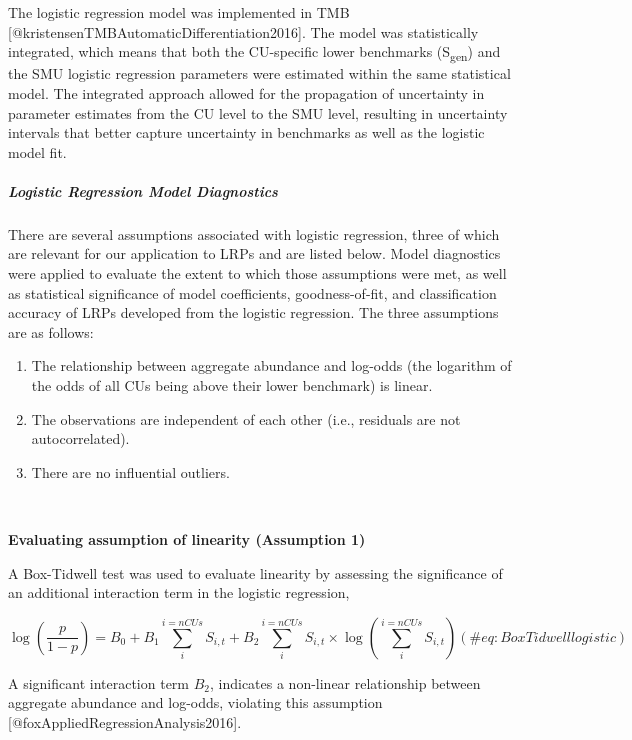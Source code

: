 \documentclass[
]{article}
\begin{document}
The logistic regression model was implemented in TMB
{[}@kristensenTMBAutomaticDifferentiation2016{]}. The model was
statistically integrated, which means that both the CU-specific lower
benchmarks (S\textsubscript{gen}) and the SMU logistic regression
parameters were estimated within the same statistical model. The
integrated approach allowed for the propagation of uncertainty in
parameter estimates from the CU level to the SMU level, resulting in
uncertainty intervals that better capture uncertainty in benchmarks as
well as the logistic model fit.

\hypertarget{logistic-regression-model-diagnostics}{%
\subparagraph{Logistic Regression Model
Diagnostics}\label{logistic-regression-model-diagnostics}}

There are several assumptions associated with logistic regression, three
of which are relevant for our application to LRPs and are listed below.
Model diagnostics were applied to evaluate the extent to which those
assumptions were met, as well as statistical significance of model
coefficients, goodness-of-fit, and classification accuracy of LRPs
developed from the logistic regression. The three assumptions are as
follows:

\begin{enumerate}
\def\labelenumi{\arabic{enumi}.}
\item
  The relationship between aggregate abundance and log-odds (the
  logarithm of the odds of all CUs being above their lower benchmark) is
  linear.
\item
  The observations are independent of each other (i.e., residuals are
  not autocorrelated).
\item
  There are no influential outliers.
\end{enumerate}

~

\textbf{Evaluating assumption of linearity (Assumption 1)}

A Box-Tidwell test was used to evaluate linearity by assessing the
significance of an additional interaction term in the logistic
regression,

\begin{equation}
  \log(\frac{p}{1-p}) = B_0 + B_1 \sum_{i}^{i=nCUs} S_{i,t} + B_2 \sum_{i}^{i=nCUs} S_{i,t} \times \log (\sum_{i}^{i=nCUs} S_{i,t})
   (\#eq:BoxTidwelllogistic)
\end{equation}

A significant interaction term \(B_2\), indicates a non-linear
relationship between aggregate abundance and log-odds, violating this
assumption {[}@foxAppliedRegressionAnalysis2016{]}.
\end{document}
